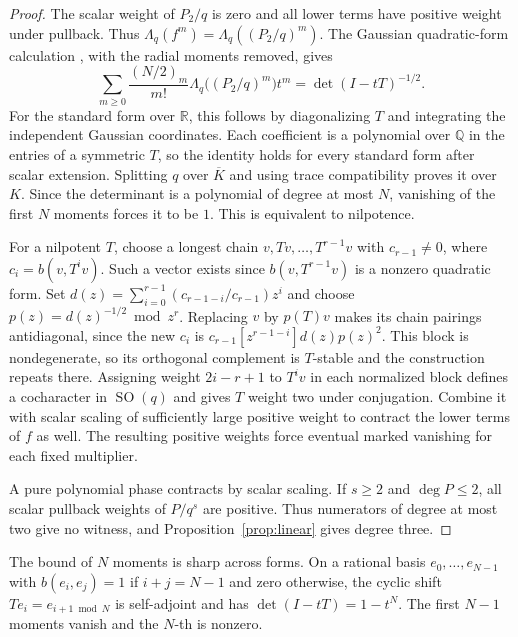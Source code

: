 \documentclass[11pt]{article}
\DeclareMathOperator{\SO}{SO}
\newcommand{\Lq}{\Lambda_q}
\begin{document}
\begin{proof}
The scalar weight of \(P_2/q\) is zero and all lower terms have
positive weight under pullback. Thus \(\Lq(f^m)=\Lq((P_2/q)^m)\).
The Gaussian quadratic-form calculation
\cite[Thms.~1--2]{Lancaster}, with the radial moments removed, gives
\[
 \sum_{m\ge0}\frac{(N/2)_m}{m!}\Lq\bigl((P_2/q)^m\bigr)t^m
        =\det(I-tT)^{-1/2}.
\]
For the standard form over \(\mathbb R\), this follows by diagonalizing
\(T\) and integrating the independent Gaussian coordinates.
Each coefficient is a polynomial over \(\mathbb Q\) in the entries
of a symmetric \(T\), so the identity holds for every standard
form after scalar extension. Splitting \(q\) over \(\overline K\)
and using trace compatibility proves it over \(K\).
Since the determinant is a polynomial of degree at most \(N\),
vanishing of the first \(N\) moments forces it to be \(1\).
This is equivalent to nilpotence.

For a nilpotent \(T\), choose a longest chain \(v,Tv,\ldots,T^{r-1}v\)
with %
\(c_{r-1} \neq 0\)\EndAccSupp{}, where \(c_i=b(v,T^iv)\). Such a vector
exists since \(b(v,T^{r-1}v)\) is a nonzero quadratic form.
Set
\(d(z)=\sum_{i=0}^{r-1}(c_{r-1-i}/c_{r-1})z^i\) and choose
\(p(z)=d(z)^{-1/2}\bmod z^r\). Replacing \(v\) by \(p(T)v\)
makes its chain pairings antidiagonal, since the new \(c_i\)
is \(c_{r-1}[z^{r-1-i}]d(z)p(z)^2\).
This block is nondegenerate, so its orthogonal complement is
\(T\)-stable and the construction repeats there. Assigning
weight \(2i-r+1\) to \(T^iv\) in each normalized block defines
a cocharacter in \(\SO(q)\) and gives \(T\) weight two under
conjugation. Combine it with scalar scaling of sufficiently large
positive weight to contract the lower terms of \(f\) as well.
The resulting positive weights force eventual marked vanishing
for each fixed multiplier.

A pure polynomial phase contracts by scalar scaling. If \(s\ge2\)
and \(\deg P\le2\), all scalar pullback weights of \(P/q^s\)
are positive. Thus numerators of degree at most two give no
witness, and Proposition~\ref{prop:linear} gives degree three.
\end{proof}

The bound of \(N\) moments is sharp across forms. On a rational
basis \(e_0,\ldots,e_{N-1}\) with \(b(e_i,e_j)=1\) if \(i+j=N-1\)
and zero otherwise, the cyclic shift \(Te_i=e_{i+1\bmod N}\)
is self-adjoint and has \(\det(I-tT)=1-t^N\).
The first \(N-1\) moments vanish and the \(N\)-th is nonzero.
\end{document}
